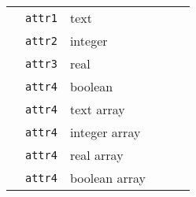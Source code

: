 \begin{table}[h]
\begin{center}
\begin{tabularx}{\textwidth}{l l l l l l }
   &   \texttt{attr1}     &  text              &                  &                     &                       \\
   &   \texttt{attr2}     &  integer           &                  &                     &                       \\
   &   \texttt{attr3}     &  real              &                  &                     &                       \\
   &   \texttt{attr4}     &  boolean           &                  &                     &                       \\
   &   \texttt{attr4}     &  text array        &                  &                     &                       \\
   &   \texttt{attr4}     &  integer array     &                  &                     &                       \\
   &   \texttt{attr4}     &  real array        &                  &                     &                       \\
   &   \texttt{attr4}     &  boolean array     &                  &                     &                       \\
  \hline
\end{tabularx}
\end{center}
\end{table}




